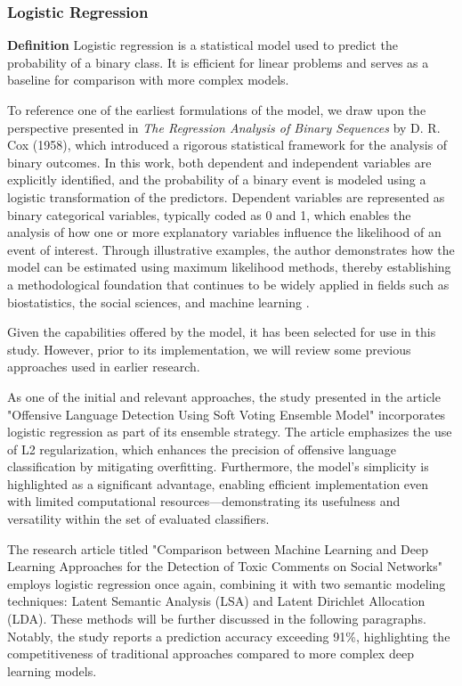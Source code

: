\subsubsection{Logistic Regression}
\textbf{Definition}
Logistic regression is a statistical model used to predict the probability of a binary class. It is efficient for linear problems and serves as a baseline for comparison with more complex models.

To reference one of the earliest formulations of the model, we draw upon the perspective presented in \textit{The Regression Analysis of Binary Sequences} by D. R. Cox (1958), which introduced a rigorous statistical framework for the analysis of binary outcomes. In this work, both dependent and independent variables are explicitly identified, and the probability of a binary event is modeled using a logistic transformation of the predictors. Dependent variables are represented as binary categorical variables, typically coded as 0 and 1, which enables the analysis of how one or more explanatory variables influence the likelihood of an event of interest. Through illustrative examples, the author demonstrates how the model can be estimated using maximum likelihood methods, thereby establishing a methodological foundation that continues to be widely applied in fields such as biostatistics, the social sciences, and machine learning \citep{cox1958logistic}.

Given the capabilities offered by the model, it has been selected for use in this study. However, prior to its implementation, we will review some previous approaches used in earlier research.

As one of the initial and relevant approaches, the study presented in the article "Offensive Language Detection Using Soft Voting Ensemble Model" \citep{fieri2023offensive} incorporates logistic regression as part of its ensemble strategy. The article emphasizes the use of L2 regularization, which enhances the precision of offensive language classification by mitigating overfitting. Furthermore, the model's simplicity is highlighted as a significant advantage, enabling efficient implementation even with limited computational resources—demonstrating its usefulness and versatility within the set of evaluated classifiers.

The research article titled "Comparison between Machine Learning and Deep Learning Approaches for the Detection of Toxic Comments on Social Networks" \citep{bonetti2023comparison} employs logistic regression once again, combining it with two semantic modeling techniques: Latent Semantic Analysis (LSA) and Latent Dirichlet Allocation (LDA). These methods will be further discussed in the following paragraphs. Notably, the study reports a prediction accuracy exceeding 91\%, highlighting the competitiveness of traditional approaches compared to more complex deep learning models.
